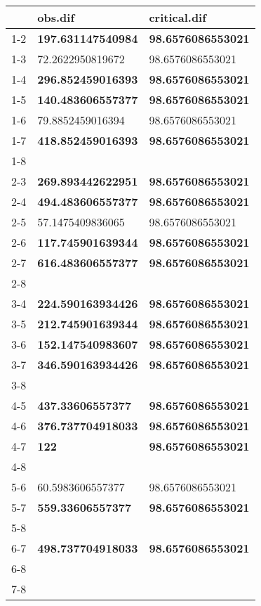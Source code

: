 \begin{table}[ht]
\centering
\begin{tabular}{rll}
  \hline
 & obs.dif & critical.dif \\ 
  \hline
1-2 & \textbf{197.631147540984} & \textbf{98.6576086553021} \\ 
  1-3 & 72.2622950819672 & 98.6576086553021 \\ 
  1-4 & \textbf{296.852459016393} & \textbf{98.6576086553021} \\ 
  1-5 & \textbf{140.483606557377} & \textbf{98.6576086553021} \\ 
  1-6 & 79.8852459016394 & 98.6576086553021 \\ 
  1-7 & \textbf{418.852459016393} & \textbf{98.6576086553021} \\ 
  1-8 &  &  \\ 
  2-3 & \textbf{269.893442622951} & \textbf{98.6576086553021} \\ 
  2-4 & \textbf{494.483606557377} & \textbf{98.6576086553021} \\ 
  2-5 & 57.1475409836065 & 98.6576086553021 \\ 
  2-6 & \textbf{117.745901639344} & \textbf{98.6576086553021} \\ 
  2-7 & \textbf{616.483606557377} & \textbf{98.6576086553021} \\ 
  2-8 &  &  \\ 
  3-4 & \textbf{224.590163934426} & \textbf{98.6576086553021} \\ 
  3-5 & \textbf{212.745901639344} & \textbf{98.6576086553021} \\ 
  3-6 & \textbf{152.147540983607} & \textbf{98.6576086553021} \\ 
  3-7 & \textbf{346.590163934426} & \textbf{98.6576086553021} \\ 
  3-8 &  &  \\ 
  4-5 & \textbf{437.33606557377} & \textbf{98.6576086553021} \\ 
  4-6 & \textbf{376.737704918033} & \textbf{98.6576086553021} \\ 
  4-7 & \textbf{122} & \textbf{98.6576086553021} \\ 
  4-8 &  &  \\ 
  5-6 & 60.5983606557377 & 98.6576086553021 \\ 
  5-7 & \textbf{559.33606557377} & \textbf{98.6576086553021} \\ 
  5-8 &  &  \\ 
  6-7 & \textbf{498.737704918033} & \textbf{98.6576086553021} \\ 
  6-8 &  &  \\ 
  7-8 &  &  \\ 
   \hline
\end{tabular}
\end{table}
